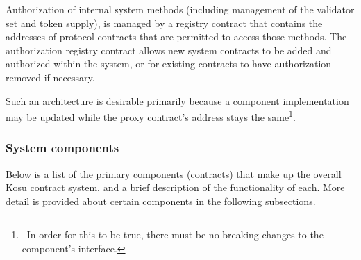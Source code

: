 \documentclass[10pt]{article}
\begin{document}
Authorization of internal system methods (including management of the validator set and token supply), is managed by a registry contract that contains the addresses of protocol contracts that are permitted to access those methods. The authorization registry contract allows new system contracts to be added and authorized within the system, or for existing contracts to have authorization removed if necessary. 
\medskip

Such an architecture is desirable primarily because a component implementation may be updated while the proxy contract's address stays the same\footnote{\ In order for this to be true, there must be no breaking changes to the component's interface.}.

\subsubsection{System components}\label{ethereum-contract-system-components}
Below is a list of the primary components (contracts) that make up the overall Kosu contract system, and a brief description of the functionality of each. More detail is provided about certain components in the following subsections.
\end{document}
